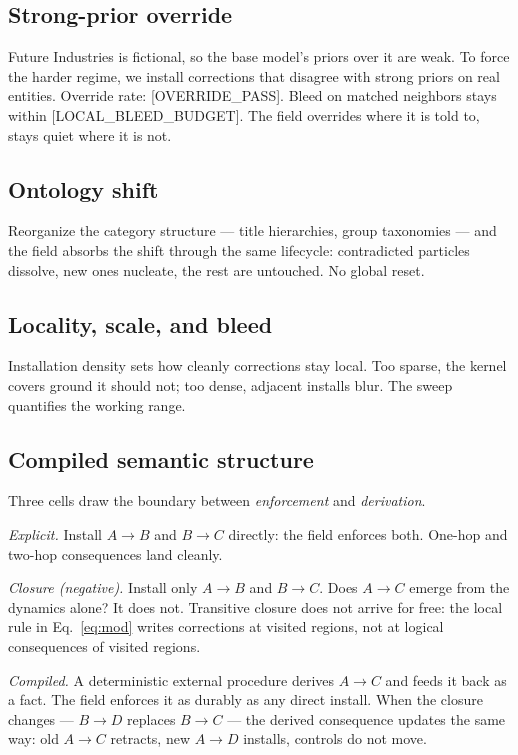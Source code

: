 \documentclass[11pt,twocolumn]{article}
\newcommand{\PH}[1]{[\textsc{#1}]}
\theoremstyle{plain}
\begin{document}
\subsection{Strong-prior override}

Future Industries is fictional, so the base model's priors over it are weak. To force the harder regime, we install corrections that disagree with strong priors on real entities. Override rate: \PH{OVERRIDE\_PASS}. Bleed on matched neighbors stays within \PH{LOCAL\_BLEED\_BUDGET}. The field overrides where it is told to, stays quiet where it is not.

\subsection{Ontology shift}

Reorganize the category structure --- title hierarchies, group taxonomies --- and the field absorbs the shift through the same lifecycle: contradicted particles dissolve, new ones nucleate, the rest are untouched. No global reset.

\subsection{Locality, scale, and bleed}

Installation density sets how cleanly corrections stay local. Too sparse, the kernel covers ground it should not; too dense, adjacent installs blur. The sweep quantifies the working range.

\subsection{Compiled semantic structure}

Three cells draw the boundary between \emph{enforcement} and \emph{derivation}.

\emph{Explicit.} Install $A \to B$ and $B \to C$ directly: the field enforces both. One-hop and two-hop consequences land cleanly.

\emph{Closure (negative).} Install only $A \to B$ and $B \to C$. Does $A \to C$ emerge from the dynamics alone? It does not. Transitive closure does not arrive for free: the local rule in Eq.~\eqref{eq:mod} writes corrections at visited regions, not at logical consequences of visited regions.

\emph{Compiled.} A deterministic external procedure derives $A \to C$ and feeds it back as a fact. The field enforces it as durably as any direct install. When the closure changes --- $B \to D$ replaces $B \to C$ --- the derived consequence updates the same way: old $A \to C$ retracts, new $A \to D$ installs, controls do not move.
\end{document}
